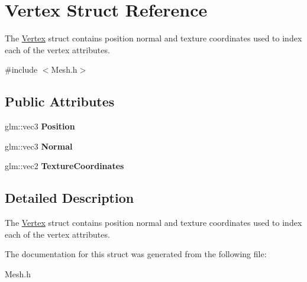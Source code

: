 \hypertarget{struct_vertex}{}\section{Vertex Struct Reference}
\label{struct_vertex}


The \hyperlink{struct_vertex}{Vertex} struct contains position normal and texture coordinates used to index each of the vertex attributes.  




{\ttfamily \#include $<$Mesh.\+h$>$}

\subsection*{Public Attributes}
\begin{DoxyCompactItemize}
\item 
\hypertarget{struct_vertex_abb3cfacd96b5955b0cec9359840ee49f}{}glm\+::vec3 {\bfseries Position}\label{struct_vertex_abb3cfacd96b5955b0cec9359840ee49f}

\item 
\hypertarget{struct_vertex_a9ab4dc431b41509f0b1bb1a4bf09d4e2}{}glm\+::vec3 {\bfseries Normal}\label{struct_vertex_a9ab4dc431b41509f0b1bb1a4bf09d4e2}

\item 
\hypertarget{struct_vertex_aacb5c10fd66d3c6b12771fa50b0ebf10}{}glm\+::vec2 {\bfseries Texture\+Coordinates}\label{struct_vertex_aacb5c10fd66d3c6b12771fa50b0ebf10}

\end{DoxyCompactItemize}


\subsection{Detailed Description}
The \hyperlink{struct_vertex}{Vertex} struct contains position normal and texture coordinates used to index each of the vertex attributes. 

The documentation for this struct was generated from the following file\+:\begin{DoxyCompactItemize}
\item 
Mesh.\+h\end{DoxyCompactItemize}
